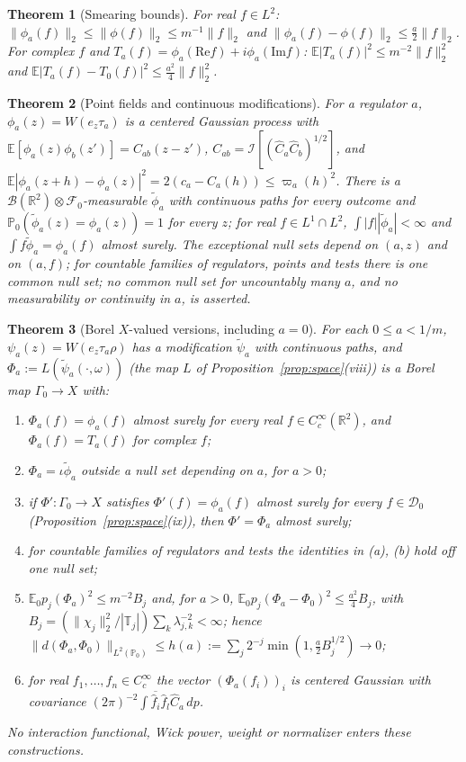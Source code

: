 \documentclass[11pt]{article}
\theoremstyle{plain}
\newtheorem{theorem}{Theorem}[section]
\theoremstyle{definition}
\theoremstyle{remark}
\newcommand{\R}{\mathbb{R}}
\newcommand{\E}{\mathbb{E}}
\newcommand{\PP}{\mathbb{P}}
\newcommand{\T}{\mathbb{T}}
\newcommand{\cB}{\mathcal{B}}
\newcommand{\cD}{\mathcal{D}}
\newcommand{\cF}{\mathcal{F}}
\newcommand{\cI}{\mathcal{I}}
\newcommand{\conj}[1]{\overline{#1}}
\begin{document}
\begin{theorem}[Smearing bounds]\label{thm:G-bounds}
For real $f\in L^{2}$: $\|\phi_a(f)\|_2\le\|\phi(f)\|_2\le m^{-1}\|f\|_2$ and
$\|\phi_a(f)-\phi(f)\|_2\le\tfrac a2\|f\|_2$. For complex $f$ and
$T_a(f)=\phi_a(\mathrm{Re}f)+i\phi_a(\mathrm{Im}f)$: $\E|T_a(f)|^{2}\le m^{-2}\|f\|_2^{2}$ and
$\E|T_a(f)-T_0(f)|^{2}\le\tfrac{a^{2}}4\|f\|_2^{2}$.
\end{theorem}

\begin{theorem}[Point fields and continuous modifications]\label{thm:G-point}
For a regulator $a$, $\phi_a(z)=W(e_z\tau_a)$ is a centered Gaussian process with
$\E[\phi_a(z)\phi_b(z')]=C_{ab}(z-z')$, $C_{ab}=\cI[(\hat C_a\hat C_b)^{1/2}]$, and
$\E|\phi_a(z+h)-\phi_a(z)|^{2}=2(c_a-C_a(h))\le\varpi_a(h)^{2}$. There is a
$\cB(\R^{2})\otimes\cF_0$-measurable $\tilde\phi_a$ with continuous paths for every
outcome and $\PP_0(\tilde\phi_a(z)=\phi_a(z))=1$ for every $z$; for real
$f\in L^{1}\cap L^{2}$, $\int|f||\tilde\phi_a|<\infty$ and $\int f\tilde\phi_a=\phi_a(f)$ almost
surely. The exceptional null sets depend on $(a,z)$ and on $(a,f)$; for countable
families of regulators, points and tests there is one common null set; no common
null set for uncountably many $a$, and no measurability or continuity in $a$, is
asserted.
\end{theorem}

\begin{theorem}[Borel $X$-valued versions, including $a=0$]\label{thm:G-versions}
For each $0\le a<1/m$, $\psi_a(z)=W(e_z\tau_a\rho)$ has a modification
$\tilde\psi_a$ with continuous paths, and $\Phi_a:=L(\tilde\psi_a(\cdot,\omega))$ (the map
$L$ of Proposition~\ref{prop:space}(viii)) is a Borel map $\Gamma_0\to X$ with:
\begin{enumerate}[label=(\alph*)]
\item $\Phi_a(f)=\phi_a(f)$ almost surely for every real $f\in C_c^{\infty}(\R^{2})$, and
  $\Phi_a(f)=T_a(f)$ for complex $f$;
\item $\Phi_a=\iota\tilde\phi_a$ outside a null set depending on $a$, for $a>0$;
\item if $\Phi':\Gamma_0\to X$ satisfies $\Phi'(f)=\phi_a(f)$ almost surely for every
  $f\in\cD_0$ (Proposition~\ref{prop:space}(ix)), then $\Phi'=\Phi_a$ almost surely;
\item for countable families of regulators and tests the identities in (a), (b)
  hold off one null set;
\item $\E_0p_j(\Phi_a)^{2}\le m^{-2}B_j$ and, for $a>0$, $\E_0p_j(\Phi_a-\Phi_0)^{2}\le\tfrac{a^{2}}4B_j$,
  with $B_j=(\|\chi_j\|_2^{2}/|\T_j|)\sum_{k}\lambda_{j,k}^{-2}<\infty$; hence
  $\|d(\Phi_a,\Phi_0)\|_{L^{2}(\PP_0)}\le h(a):=\sum_j2^{-j}\min(1,\tfrac a2B_j^{1/2})\to0$;
\item for real $f_1,\dots,f_n\in C_c^{\infty}$ the vector $(\Phi_a(f_i))_i$ is centered
  Gaussian with covariance $(2\pi)^{-2}\int\conj{\hat f_i}\hat f_l\hat C_a\,dp$.
\end{enumerate}
No interaction functional, Wick power, weight or normalizer enters these
constructions.
\end{theorem}
\end{document}
